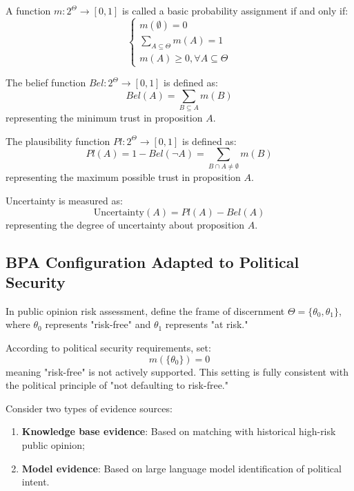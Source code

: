 \documentclass[11pt,a4paper]{report}
\begin{document}
\begin{definition}
A function $m: 2^\Theta \rightarrow [0,1]$ is called a basic probability assignment if and only if:
\[
\begin{cases}
m(\emptyset) = 0 \\
\sum_{A \subseteq \Theta} m(A) = 1 \\
m(A) \geq 0, \forall A \subseteq \Theta
\end{cases}
\]
\end{definition}

\begin{definition}
The belief function $Bel: 2^\Theta \rightarrow [0,1]$ is defined as:
\[
Bel(A) = \sum_{B \subseteq A} m(B)
\]
representing the minimum trust in proposition $A$.
\end{definition}

\begin{definition}
The plausibility function $Pl: 2^\Theta \rightarrow [0,1]$ is defined as:
\[
Pl(A) = 1 - Bel(\neg A) = \sum_{B \cap A \neq \emptyset} m(B)
\]
representing the maximum possible trust in proposition $A$.
\end{definition}

\begin{definition}[Uncertainty]
Uncertainty is measured as:
\[
\mathrm{Uncertainty}(A) = Pl(A) - Bel(A)
\]
representing the degree of uncertainty about proposition $A$.
\end{definition}

\subsection{BPA Configuration Adapted to Political Security}

In public opinion risk assessment, define the frame of discernment $\Theta = \{\theta_0, \theta_1\}$, where $\theta_0$ represents "risk-free" and $\theta_1$ represents "at risk."

According to political security requirements, set:
\[
m(\{\theta_0\}) = 0
\]
meaning "risk-free" is not actively supported. This setting is fully consistent with the political principle of "not defaulting to risk-free."

Consider two types of evidence sources:
\begin{enumerate}
    \item \textbf{Knowledge base evidence}: Based on matching with historical high-risk public opinion;
    \item \textbf{Model evidence}: Based on large language model identification of political intent.
\end{enumerate}
\end{document}
